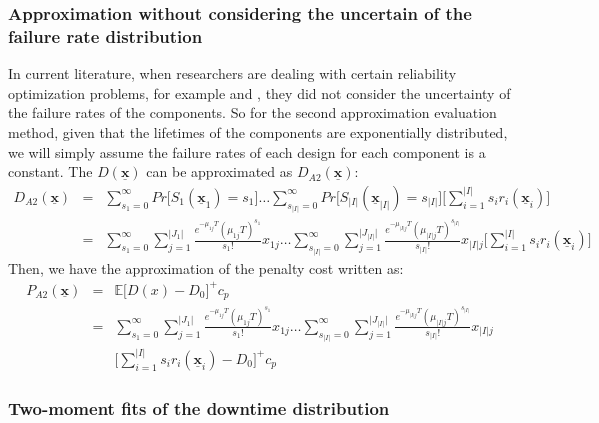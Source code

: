 \documentclass[preprint,12pt]{elsarticle}
\begin{document}
\subsubsection{Approximation without considering the uncertain of the failure rate distribution}
In current literature, when researchers are dealing with certain reliability optimization problems, for example \citet{Mettas} \citet{Oner2010} and \citet{Huang}, they did not consider the uncertainty of the failure rates of the components. So for the second approximation evaluation method, given that the lifetimes of the components are exponentially distributed, we will simply assume the failure rates of each design for each component is a constant. The $D(\boldsymbol{\underline{x}})$ can be approximated as $D_{A2}(\boldsymbol{\underline{x}})$:
\small{
\begin{eqnarray}
D_{A2}(\boldsymbol{\underline{x}}) &=& \sum_{s_{1}=0}^{\infty}Pr\bigg[S_{1}(\underline{\boldsymbol{x}}_{1})=s_{1}\bigg]\dots  \sum_{s_{\lvert I \rvert}=0}^{\infty}
Pr\bigg[S_{\lvert I \rvert}(\underline{\boldsymbol{x}}_{\lvert I \rvert})=s_{\lvert I \rvert}\bigg]\bigg[\sum_{i=1}^{\rvert I \lvert}s_{i}r_{i}(\boldsymbol{\underline{x}}_{i})\bigg] \nonumber\\
&=& \sum_{s_{1}=0}^{\infty}\sum_{j=1}^{\rvert J_{1}\lvert}{\frac{e^{-\mu_{1j}T}(\mu_{1j}T)^{s_{1}}}{s_{1}!}x_{1j}} \dots \sum_{s_{\rvert I \lvert}=0}^{\infty}\sum_{j=1}^{\rvert J_{\rvert I \lvert}\lvert}{\frac{e^{-\mu_{\rvert I \lvert j}T}(\mu_{\rvert I \lvert j}T)^{s_{\rvert I \lvert}}}{s_{\rvert I \lvert}!}x_{\rvert I \lvert j}}\bigg[\sum_{i=1}^{\rvert I \lvert}s_{i}r_{i}(\boldsymbol{\underline{x}}_{i})\bigg]
\end{eqnarray}
}
Then, we have the approximation of the penalty cost written as:
\small{
\begin{eqnarray}
P_{A2}(\boldsymbol{\underline{x}}) &=& \mathbb{E}\bigg[D(x)-D_{0}\bigg]^{+}c_p \nonumber\\
&=& \sum_{s_{1}=0}^{\infty}\sum_{j=1}^{\rvert J_{1}\lvert}{\frac{e^{-\mu_{1j}T}(\mu_{1j}T)^{s_{1}}}{s_{1}!}x_{1j}} \dots \sum_{s_{\rvert I \lvert}=0}^{\infty}\sum_{j=1}^{\rvert J_{\rvert I \lvert}\lvert}{\frac{e^{-\mu_{\rvert I \lvert j}T}(\mu_{\rvert I \lvert j}T)^{s_{\rvert I \lvert}}}{s_{\rvert I \lvert}!}x_{\rvert I \lvert j}} \nonumber\\
&& \bigg[\sum_{i=1}^{\rvert I \lvert}s_{i}r_{i}(\boldsymbol{\underline{x}}_{i})-D_{0}\bigg]^{+}c_{p}
\end{eqnarray}
}
\subsubsection{Two-moment fits of the downtime distribution }
\end{document}
